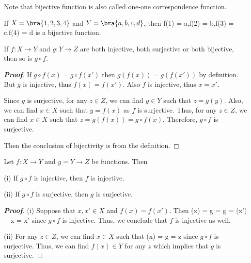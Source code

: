 \begin{remark}
Note that bijective function is also called one-one correspondence function.
\end{remark}

\begin{example}\label{exa:bijective_function_4}
If $X = \bra{1,2,3,4}$ and $Y = \bra{a,b,c,d}$, then
\be
f(1) = a,\quad f(2) = b,\quad f(3) = c,\quad f(4) = d
\ee
is a bijective function.
\end{example}


\begin{lemma}\label{lem:composition_injective_surjective_bijective_functions}%
If $f:X\to Y$ and $g: Y\to Z$ are both injective, both surjective or both bijective, then so is $g\circ f$.
\end{lemma}

\begin{proof}[\bf Proof]%
If $g\circ f(x) = g\circ f(x')$ then $g(f(x)) = g(f(x'))$ by definition. But $g$ is injective, thus $f(x) = f(x')$. Also $f$ is injective, thus $x = x'$.


Since $g$ is surjective, for any $z\in Z$, we can find $y\in Y$ such that $z = g(y)$. Also, we can find $x\in X$ such that $y = f(x)$ as $f$ is surjective. Thus, for any $z\in Z$, we can find $x\in X$ such that $z = g(f(x)) = g\circ f(x)$. Therefore, $g\circ f$ is surjective.

Then the conclusion of bijectivity is from the definition.
\end{proof}

\begin{proposition}\label{pro:composition_injective_surjective_implies_individual_injective_surjective}
Let $f:X\to Y$ and $g = Y\to Z$ be functions. Then
\ben
\item [(i)] If $g\circ f$ is injective, then $f$ is injective.
\item [(ii)] If $g\circ f$ is surjective, then $g$ is surjective.
\een
\end{proposition}

\begin{proof}[\bf Proof]
\ben
\item [(i)] Suppose that $x,x'\in X$ and $f(x) = f(x')$. Then
\be
{}(x) = g = g = (x') \ \ra\ x = x'
\ee
since $g\circ f$ is injective. Thus, we conclude that $f$ is injective as well.

\item [(ii)] For any $z\in Z$, we can find $x\in X$ such that
\be
{}(x) = g = z
\ee
since $g\circ f$ is surjective. Thus, we can find $f(x)\in Y$ for any $z$ which implies that $g$ is surjective.
\een
\end{proof}

